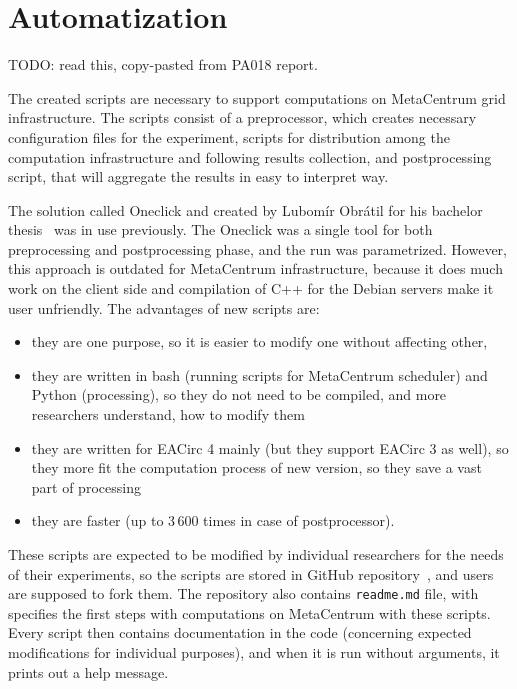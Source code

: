 \documentclass[
  print, %
  Table,   %
  nolof,     %
  nolot,     %
  draft, %
  11pt, %
  oneside  %
]{fithesis3}
\begin{document}
\section{Automatization}

TODO: read this, copy-pasted from PA018 report.

The created scripts are necessary to support computations on MetaCentrum grid infrastructure. The scripts consist of a preprocessor, which creates necessary configuration files for the experiment, scripts for distribution among the computation infrastructure and following results collection, and postprocessing script, that will aggregate the results in easy to interpret way.

The solution called Oneclick and created by Lubomír Obrátil for his bachelor thesis~\cite{obratilBcThesis} was in use previously. The Oneclick was a single tool for both preprocessing and postprocessing phase, and the run was parametrized. However, this approach is outdated for MetaCentrum infrastructure, because it does much work on the client side and compilation of C++ for the Debian servers make it user unfriendly. The advantages of new scripts are: 

\begin{itemize}
    \item they are one purpose, so it is easier to modify one without affecting other,
    \item they are written in bash (running scripts for MetaCentrum scheduler) and Python (processing), so they do not need to be compiled, and more researchers understand, how to modify them
    \item they are written for EACirc 4 mainly (but they support EACirc 3 as well), so they more fit the computation process of new version, so they save a vast part of processing
    \item they are faster (up to 3\,600 times in case of postprocessor).
\end{itemize}

These scripts are expected to be modified by individual researchers for the needs of their experiments, so the scripts are stored in GitHub repository~\cite{eaUtils}, and users are supposed to fork them. The repository also contains \texttt{readme.md} file, with specifies the first steps with computations on MetaCentrum with these scripts. Every script then contains documentation in the code (concerning expected modifications for individual purposes), and when it is run without arguments, it prints out a help message.
\end{document}

